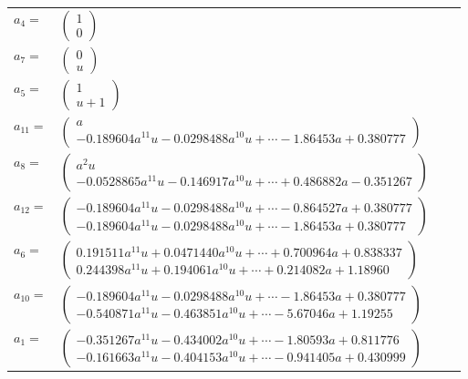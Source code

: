 \documentclass[1p]{elsarticle_modified}
\theoremstyle{definition}
\begin{document}
\begin{tabular}{m{7pt} m{180pt} m{7pt} m{180pt} }
\flushright $a_{4}=$&$\begin{pmatrix}1\\0\end{pmatrix}$ \\
\flushright $a_{7}=$&$\begin{pmatrix}0\\u\end{pmatrix}$ \\
\flushright $a_{5}=$&$\begin{pmatrix}1\\u+1\end{pmatrix}$ \\
\flushright $a_{11}=$&$\begin{pmatrix}a\\-0.189604 a^{11} u-0.0298488 a^{10} u+\cdots-1.86453 a+0.380777\end{pmatrix}$ \\
\flushright $a_{8}=$&$\begin{pmatrix}a^2 u\\-0.0528865 a^{11} u-0.146917 a^{10} u+\cdots+0.486882 a-0.351267\end{pmatrix}$ \\
\flushright $a_{12}=$&$\begin{pmatrix}-0.189604 a^{11} u-0.0298488 a^{10} u+\cdots-0.864527 a+0.380777\\-0.189604 a^{11} u-0.0298488 a^{10} u+\cdots-1.86453 a+0.380777\end{pmatrix}$ \\
\flushright $a_{6}=$&$\begin{pmatrix}0.191511 a^{11} u+0.0471440 a^{10} u+\cdots+0.700964 a+0.838337\\0.244398 a^{11} u+0.194061 a^{10} u+\cdots+0.214082 a+1.18960\end{pmatrix}$ \\
\flushright $a_{10}=$&$\begin{pmatrix}-0.189604 a^{11} u-0.0298488 a^{10} u+\cdots-1.86453 a+0.380777\\-0.540871 a^{11} u-0.463851 a^{10} u+\cdots-5.67046 a+1.19255\end{pmatrix}$ \\
\flushright $a_{1}=$&$\begin{pmatrix}-0.351267 a^{11} u-0.434002 a^{10} u+\cdots-1.80593 a+0.811776\\-0.161663 a^{11} u-0.404153 a^{10} u+\cdots-0.941405 a+0.430999\end{pmatrix}$ \\

\end{tabular}
\end{document}
